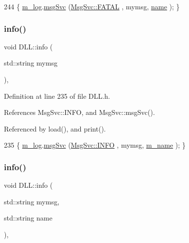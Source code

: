 \begin{DoxyCode}
244 \{ \hyperlink{classDLL_a6e66cd993e2d142b48691557ce8e4047}{m\_log}.\hyperlink{classMsgSvc_ad25f18047920cc59a314e5098259711c}{msgSvc} (\hyperlink{classMsgSvc_ae671eb7301996cd049d2da8a65925926a59c73cb29edfc9cdf35845e2b1301363}{MsgSvc::FATAL}   , mymsg, \hyperlink{classDLL_a0a915d538771dde2cb0580cd340ee088}{name} ); \}
\end{DoxyCode}
\mbox{\label{classDLL_a2b7ea0c85b83a1dec03e4fce13c0d5d2}} 
\subsubsection{\texorpdfstring{info()}{info()}\hspace{0.1cm}{\footnotesize\ttfamily [1/2]}}
{\footnotesize\ttfamily void D\+L\+L\+::info (\begin{DoxyParamCaption}\item[{std\+::string}]{mymsg }\end{DoxyParamCaption})\hspace{0.3cm}{\ttfamily [inline]}, {\ttfamily [private]}}



Definition at line 235 of file D\+L\+L.\+h.



References Msg\+Svc\+::\+I\+N\+FO, and Msg\+Svc\+::msg\+Svc().



Referenced by load(), and print().


\begin{DoxyCode}
235 \{ \hyperlink{classDLL_a6e66cd993e2d142b48691557ce8e4047}{m\_log}.\hyperlink{classMsgSvc_ad25f18047920cc59a314e5098259711c}{msgSvc} (\hyperlink{classMsgSvc_ae671eb7301996cd049d2da8a65925926ad2fcf3f3e734fc41ee097cc23670ce51}{MsgSvc::INFO}    , mymsg, \hyperlink{classDLL_ad5e4d36d8c2575447f73acc2a703b405}{m\_name} ); \}
\end{DoxyCode}
\mbox{\label{classDLL_ac7c5b201c76267167f3543d524d06046}} 
\subsubsection{\texorpdfstring{info()}{info()}\hspace{0.1cm}{\footnotesize\ttfamily [2/2]}}
{\footnotesize\ttfamily void D\+L\+L\+::info (\begin{DoxyParamCaption}\item[{std\+::string}]{mymsg,  }\item[{std\+::string}]{name }\end{DoxyParamCaption})\hspace{0.3cm}{\ttfamily [inline]}, {\ttfamily [private]}}




